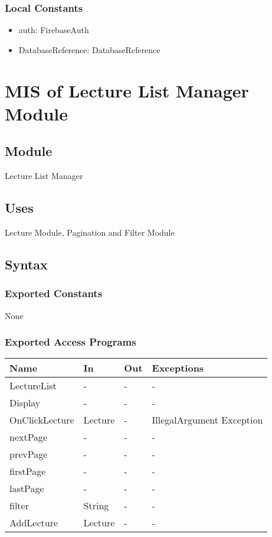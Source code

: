 \documentclass[12pt, titlepage]{article}
\begin{document}
\subsubsection{Local Constants}

\begin{itemize}
  \item auth: FirebaseAuth
  \item DatabaseReference: DatabaseReference
\end{itemize}

\newpage

\section{MIS of Lecture List Manager Module} \label{mLL}

\subsection{Module}

Lecture List Manager

\subsection{Uses}

Lecture Module, Pagination and Filter Module

\subsection{Syntax}

\subsubsection{Exported Constants}
None

\subsubsection{Exported Access Programs}
\begin{center}
\begin{tabular}{p{4cm} p{2cm} p{4cm} p{4cm}}
\hline
\textbf{Name} & \textbf{In} & \textbf{Out} & \textbf{Exceptions} \\
\hline
LectureList & - & - & -\\
Display & - & - & - \\
OnClickLecture & Lecture & - & IllegalArgument Exception\\ 
nextPage & - & - &  -\\
prevPage & - & - &  -\\
firstPage & - & - &  -\\
lastPage & - & - &  -\\
filter & String & - & -\\
AddLecture & Lecture & - & - \\
\hline
\end{tabular}
\end{center}
\end{document}
